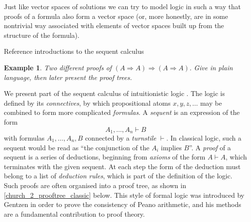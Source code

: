 \documentclass[english,letter paper,12pt,reqno]{article}
\theoremstyle{example}
\newtheorem{example}[theorem]{Example}
\numberwithin{equation}{section}
\begin{document}
Just like vector spaces of solutions we can try to model logic in such a way that proofs of a formula also form a vector space (or, more honestly, are in some nontrivial way associated with elements of vector spaces built up from the structure of the formula).

Reference introductions to the sequent calculus

\begin{example} Two different proofs of $(A \Rightarrow A) \Rightarrow (A \Rightarrow A)$. Give in plain language, then later present the proof trees.
\end{example}

We present part of the sequent calculus of intuitionistic logic \cite{gentzen}. The logic is defined by its \emph{connectives}, by which propositional atoms $x,y,z,\ldots$ may be combined to form more complicated \emph{formulas}. A \emph{sequent} is an expression of the form
\[
A_1,\ldots,A_n \vdash B
\]
with formulas $A_1,\ldots,A_n, B$ connected by a \emph{turnstile} $\vdash$. In classical logic, such a sequent would be read as ``the conjunction of the $A_i$ implies $B$''. A \emph{proof} of a sequent is a series of deductions, beginning from \emph{axioms} of the form $A \vdash A$, which terminates with the given sequent. At each step the form of the deduction must belong to a list of \emph{deduction rules}, which is part of the definition of the logic. Such proofs are often organised into a proof tree, as shown in \eqref{church_2_prooftree_classic} below. This style of formal logic was introduced by Gentzen \cite{gentzen} in order to prove the consistency of Peano arithmetic, and his methods are a fundamental contribution to proof theory.
\end{document}
